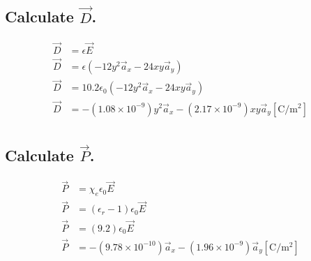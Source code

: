 \documentclass[14pt]{extarticle}
\begin{document}
\subsection{Calculate $\vec{D}$.}
\unboldmath

\begin{align*}
	\vec{D} & = \epsilon \vec{E}                                                                                      \\
	\vec{D} & = \epsilon\left(-12y^2\vec{a}_x-24xy\vec{a}_y\right)                                                    \\
	\vec{D} & = 10.2\epsilon_0\left(-12y^2\vec{a}_x-24xy\vec{a}_y\right)                                              \\
	\vec{D} & = -\left(1.08\times10^{-9}\right)y^2\vec{a}_x-\left(2.17\times10^{-9}\right)xy\vec{a}_y\mathrm{[C/m^2]} \\
\end{align*}

\boldmath
\subsection{Calculate $\vec{P}$.}
\unboldmath

\begin{align*}
	\vec{P} & = \chi_e\epsilon_0\vec{E}                                                                              \\
	\vec{P} & = (\epsilon_r-1)\epsilon_0\vec{E}                                                                      \\
	\vec{P} & = (9.2)\epsilon_0\vec{E}                                                                               \\
	\vec{P} & = -\left(9.78\times10^{-10}\right)\vec{a}_x - \left(1.96\times10^{-9}\right)\vec{a}_y \mathrm{[C/m^2]} \\
\end{align*}
\end{document}
